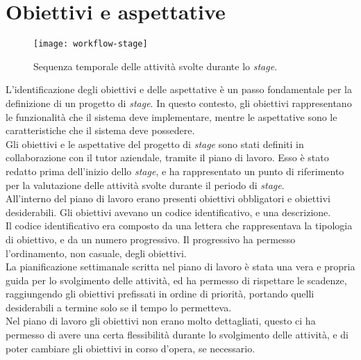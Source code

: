 \section{Obiettivi e aspettative}

\begin{figure}[!h] 
  \centering 
  \texttt{[image: workflow-stage]} 
  \caption{Sequenza temporale delle attività svolte durante lo \textit{stage}.}
  \label{fig:workflow-stage}
\end{figure}

L'identificazione degli obiettivi e delle aspettative è un passo fondamentale per la definizione di un progetto di \textit{stage}.
In questo contesto, gli obiettivi rappresentano le funzionalità che il sistema deve implementare, mentre le aspettative
sono le caratteristiche che il sistema deve possedere.\\
Gli obiettivi e le aspettative del progetto di \textit{stage} sono stati definiti in collaborazione con il tutor aziendale, 
tramite il piano di lavoro.
Esso è stato redatto prima dell'inizio dello \textit{stage}, e ha rappresentato un punto di riferimento per la valutazione
delle attività svolte durante il periodo di \textit{stage}.\\
All'interno del piano di lavoro erano presenti obiettivi obbligatori e obiettivi desiderabili.
Gli obiettivi avevano un codice identificativo, e una descrizione.\\ 
Il codice identificativo era composto da una lettera che rappresentava la tipologia di obiettivo, e da un numero progressivo.
Il progressivo ha permesso l'ordinamento, non casuale, degli obiettivi. \\
La pianificazione settimanale scritta nel piano di lavoro è stata una vera e propria guida per lo svolgimento delle attività, ed 
ha permesso di rispettare le scadenze, raggiungendo gli obiettivi prefissati in ordine di priorità, portando quelli desiderabili
a termine solo se il tempo lo permetteva.\\

Nel piano di lavoro gli obiettivi non erano molto dettagliati, questo ci ha permesso di avere una certa flessibilità durante lo svolgimento
delle attività, e di poter cambiare gli obiettivi in corso d'opera, se necessario.\\

